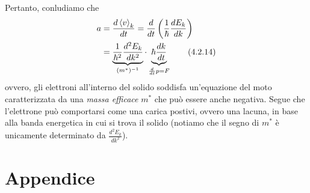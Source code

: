 \documentclass{article}
\begin{document}
Pertanto, conludiamo che 
\begin{align}
    a &= \frac{d\braket{v}_k}{dt} = \frac{d}{dt}\left(\frac{1}{\hbar}\frac{dE_k}{dk}\right) \notag \\
    &= \underbrace{\frac{1}{\hbar^2}\frac{d^2E_k}{dk^2}}_{(m^*)^{-1}} \cdot \underbrace{\hbar\frac{dk}{dt}}_{\frac{d}{dt}p = F} \tag{4.2.14}
\end{align}
ovvero, gli elettroni all'interno del solido soddisfa un'equazione del moto caratterizzata da una \textit{massa efficace} $m^*$ che può essere anche negativa. Segue che l'elettrone può comportarsi come una carica postivi, ovvero una lacuna, in base alla banda energetica in cui si trova il solido (notiamo che il segno di $m^*$ è unicamente determinato da $\frac{d^2E_k}{dk^2}$).




\newpage
\section*{Appendice}
\end{document}
